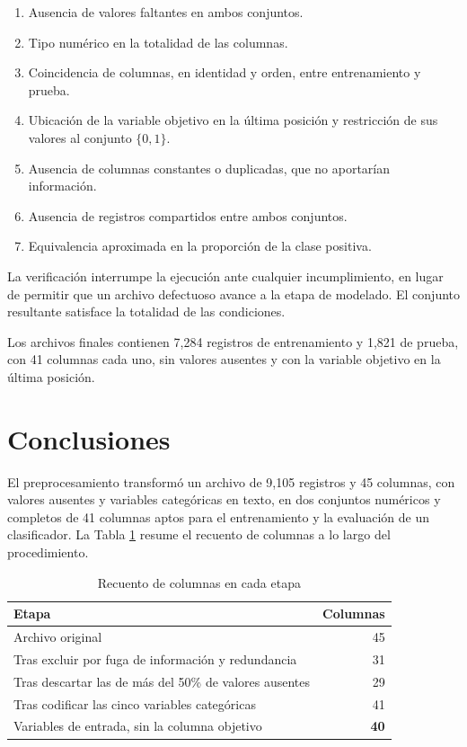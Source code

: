 \documentclass[11pt]{article}
\begin{document}
\begin{enumerate}
\item Ausencia de valores faltantes en ambos conjuntos.
\item Tipo numérico en la totalidad de las columnas.
\item Coincidencia de columnas, en identidad y orden, entre entrenamiento y prueba.
\item Ubicación de la variable objetivo en la última posición y restricción de sus valores al
      conjunto $\{0, 1\}$.
\item Ausencia de columnas constantes o duplicadas, que no aportarían información.
\item Ausencia de registros compartidos entre ambos conjuntos.
\item Equivalencia aproximada en la proporción de la clase positiva.
\end{enumerate}

La verificación interrumpe la ejecución ante cualquier incumplimiento, en lugar de permitir que un
archivo defectuoso avance a la etapa de modelado. El conjunto resultante satisface la totalidad de
las condiciones.

Los archivos finales contienen 7{,}284 registros de entrenamiento y 1{,}821 de prueba, con 41
columnas cada uno, sin valores ausentes y con la variable objetivo en la última posición.

\section{Conclusiones}
\label{sec:conclusiones}

El preprocesamiento transformó un archivo de 9{,}105 registros y 45 columnas, con valores
ausentes y variables categóricas en texto, en dos conjuntos numéricos y completos de 41 columnas
aptos para el entrenamiento y la evaluación de un clasificador. La Tabla \ref{tab:cadena} resume
el recuento de columnas a lo largo del procedimiento.

\begin{table}[H]
\centering
\caption{Recuento de columnas en cada etapa}
\label{tab:cadena}
\small
\begin{tabular}{p{7.4cm} r}
\toprule
\textbf{Etapa} & \textbf{Columnas} \\
\midrule
Archivo original                                      & 45 \\
Tras excluir por fuga de información y redundancia    & 31 \\
Tras descartar las de más del 50\% de valores ausentes & 29 \\
Tras codificar las cinco variables categóricas        & 41 \\
\midrule
Variables de entrada, sin la columna objetivo         & \textbf{40} \\
\bottomrule
\end{tabular}
\end{table}
\end{document}
